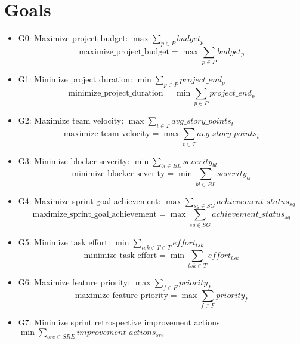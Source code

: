 \documentclass{article}
\begin{document}
\section{Goals}
\begin{itemize}
    \item G0: Maximize project budget: $\max \sum_{p \in P} budget_p$
        \begin{equation*}
            \text{maximize\_project\_budget} = \max \sum_{p \in P} budget_p
        \end{equation*}
    \item G1: Minimize project duration: $\min \sum_{p \in P} project\_end_p$
        \begin{equation*}
            \text{minimize\_project\_duration} = \min \sum_{p \in P} project\_end_p
        \end{equation*}
    \item G2: Maximize team velocity: $\max \sum_{t \in T} avg\_story\_points_t$
        \begin{equation*}
            \text{maximize\_team\_velocity} = \max \sum_{t \in T} avg\_story\_points_t
        \end{equation*}
    \item G3: Minimize blocker severity: $\min \sum_{bl \in BL} severity_{bl}$
        \begin{equation*}
            \text{minimize\_blocker\_severity} = \min \sum_{bl \in BL} severity_{bl}
        \end{equation*}
    \item G4: Maximize sprint goal achievement: $\max \sum_{sg \in SG} achievement\_status_{sg}$
        \begin{equation*}
            \text{maximize\_sprint\_goal\_achievement} = \max \sum_{sg \in SG} achievement\_status_{sg}
        \end{equation*}
    \item G5: Minimize task effort: $\min \sum_{tsk \in T \in T} effort_{tsk}$
        \begin{equation*}
            \text{minimize\_task\_effort} = \min \sum_{tsk \in T} effort_{tsk}
        \end{equation*}
    \item G6: Maximize feature priority: $\max \sum_{f \in F} priority_f$
        \begin{equation*}
            \text{maximize\_feature\_priority} = \max \sum_{f \in F} priority_f
        \end{equation*}
    \item G7: Minimize sprint retrospective improvement actions: $\min \sum_{sre \in SRE} improvement\_actions_{sre}$

\end{itemize}
\end{document}
